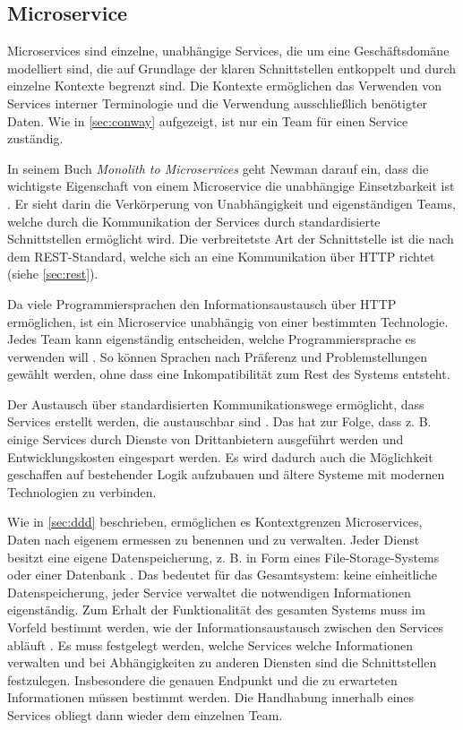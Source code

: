 \subsection{Microservice}

Microservices sind einzelne, unabhängige Services, die um eine Geschäftsdomäne modelliert sind, die auf Grundlage der klaren Schnittstellen entkoppelt und durch einzelne Kontexte begrenzt sind. Die Kontexte ermöglichen das Verwenden von Services interner Terminologie und die Verwendung ausschließlich benötigter Daten. Wie in \cref{sec:conway} aufgezeigt, ist nur ein Team für einen Service zuständig.

In seinem Buch \textit{Monolith to Microservices} geht Newman darauf ein, dass die wichtigste Eigenschaft von einem Microservice die unabhängige Einsetzbarkeit ist \parencite[vgl.][Kap. 2.1.1]{newman_monolith_2019}. Er sieht darin die Verkörperung von Unabhängigkeit und eigenständigen Teams, welche durch die Kommunikation der Services durch standardisierte Schnittstellen ermöglicht wird. Die verbreitetste Art der Schnittstelle ist die nach dem REST-Standard, welche sich an eine Kommunikation über HTTP richtet (siehe \cref{sec:rest}).
 
Da viele Programmiersprachen den Informationsaustausch über HTTP ermöglichen, ist ein Microservice unabhängig von einer bestimmten Technologie. Jedes Team kann eigenständig entscheiden, welche Programmiersprache es verwenden will \parencite[vgl.][Kap. 1.2]{wolff_microservices_2018}. So können Sprachen nach Präferenz und Problemstellungen gewählt werden, ohne dass eine Inkompatibilität zum Rest des Systems entsteht.

Der Austausch über standardisierten Kommunikationswege ermöglicht, dass Services erstellt werden, die austauschbar sind \parencite[vgl.][Kap. 1.2]{wolff_microservices_2018}. Das hat zur Folge, dass z. B. einige Services durch Dienste von Drittanbietern ausgeführt werden und Entwicklungskosten eingespart werden. Es wird dadurch auch die Möglichkeit geschaffen auf bestehender Logik aufzubauen und ältere Systeme mit modernen Technologien zu verbinden.

Wie in \cref{sec:ddd} beschrieben, ermöglichen es Kontextgrenzen Microservices, Daten nach eigenem ermessen zu benennen und zu verwalten. Jeder Dienst besitzt eine eigene Datenspeicherung, z. B. in Form eines File-Storage-Systems oder einer Datenbank \parencite[vgl.][Kap. 2.1.3]{newman_monolith_2019}. Das bedeutet für das Gesamtsystem: keine einheitliche Datenspeicherung, jeder Service verwaltet die notwendigen Informationen eigenständig. Zum Erhalt der Funktionalität des gesamten Systems muss im Vorfeld bestimmt werden, wie der Informationsaustausch zwischen den Services abläuft \parencite[vgl.][Kap. 4.1]{wolff_microservices_2018}. Es muss festgelegt werden, welche Services welche Informationen verwalten und bei Abhängigkeiten zu anderen Diensten sind die Schnittstellen festzulegen. Insbesondere die genauen Endpunkt und die zu erwarteten Informationen müssen bestimmt werden. Die Handhabung innerhalb eines Services obliegt dann wieder dem einzelnen Team. 

